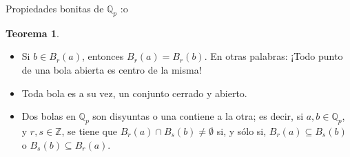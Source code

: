 \documentclass{beamer}
\newcommand{\bb}[1]{\mathbb{#1}}
\theoremstyle{definition}
\numberwithin{equation}{section}
\newcommand{\orangee}[1]{\textcolor{thColor}{#1}}
\newtheorem{thh}{\orangee{Teorema}}
\newcommand{\Z}{\mathbb{Z}}
\newcommand{\Qp}{\mathbb{Q}_p}
\begin{document}
\begin{frame}{Propiedades bonitas de $\Qp$ :o}
	\begin{thh}
	\begin{itemize}[<+- | alert@+>]
		\item \label{clopen1} Si $b\in B_{r} (a)$, entonces $B_{r} (a)=B_{r} (b)$. En otras palabras: ¡Todo  punto de una bola abierta es centro de la misma!
		\item Toda bola es a su vez, un conjunto cerrado y abierto.
		\item Dos bolas en $\Qp$ son disyuntas o una contiene a la otra; es decir, si $a,b \in \bb{Q}_p$, y $r,s\in \Z$, se tiene que $B_{r} (a)\cap B_{s} (b)\neq\emptyset$ si, y sólo si, $B_{r} (a)\subseteq B_{s} (b)$ o $B_{s} (b)\subseteq B_{r} (a)$.
	\end{itemize}	
	\end{thh}
	
	
\end{frame}
\end{document}
